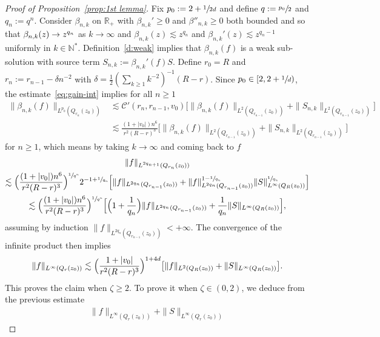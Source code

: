 \documentclass[JEP,XML,SOM,Unicode,NoFloatCountersInSection,published]{cedram}
\let\mathcal\mathscr
\theoremstyle{definition}
\theoremstyle{remark}
\newcommand\N{{\mathbb N}}
\newcommand\R{{\mathbb R}}
\newcommand{\cC}{\mathcal C}
\begin{document}
\begin{proof}[Proof of Proposition~\ref{prop:1st lemma}]
Fix $p_0:=2+\sfrac{1}{2d}$ and define $q:=\sfrac{p_0}{2}$ and
$q_n := q^n$. Consider $\beta_{n,k}$ on $\R_+$ with
$\beta_{n,k}' \ge 0$ and $\beta''_{n,k} \ge 0$ both bounded and
so that $\beta_{n,k}(z) \to\nobreak z^{q_n}$ as $k \to \infty$ and
$\beta_{n,k}(z) \lesssim z^{q_n}$ and
$\beta_{n,k}'(z) \lesssim z^{q_n-1}$ uniformly in $k \in
\N^*$. Definition~\ref{d:weak} implies that
$\beta_{n,k}(f)$ is a weak sub-solution with source term
$S_{n,k} := \beta_{n,k}'(f) S$. Define $r_0=R$ and
$r_n := r_{n-1} - \delta n^{-2}$ with
$\delta = \frac12( \sum_{k \ge 1} k^{-2}
)^{-1}(R-r)$. Since $p_0 \in [2,2+\sfrac1d)$, the
estimate~\eqref{eq:gain-int} implies for all $n \ge 1$
\begin{align*}
\|\beta_{n,k}(f)\|_{L^{p_0}(Q_{r_n}(z_0))}
& \lesssim
\cC'(r_n,r_{n-1},v_0) \bigl[
\|\beta_{n,k}(f)\|_{L^{2}(Q_{r_{n-1}}(z_0))}
+ \|S_{n,k}\|_{L^2(Q_{r_{n-1}}(z_0))} \bigr] \\
& \lesssim \frac{(1+|v_0|)n^6}{r^2(R-r)^3}
\bigl[ \|\beta_{n,k}(f)\|_{L^{2}(Q_{r_{n-1}}(z_0))}
+ \|S_{n,k}\|_{L^2(Q_{r_{n-1}}(z_0))} \bigr]
\end{align*}
for $n \ge 1$, which means by taking $k \to \infty$ and coming
back to $f$
\begin{multline*}
\|f\|_{L^{2q_{n+1}}(Q_{r_n}(z_0))} \\
\lesssim \Bigl(
\frac{(1+|v_0|)n^6}{r^2(R-r)^3} \Bigr)^{\sfrac{1}{q^n}}
2^{-1+\sfrac{1}{q_n}} \Bigl[
\|f\|_{L^{2q_n}(Q_{r_{n-1}}(z_0))} + \|
f\|_{L^{2q_n}(Q_{r_{n-1}}(z_0))}^{1-\sfrac{1}{q_n}}
\|S\|_{L^\infty(Q_R(z_0))}^{\sfrac{1}{q_n}} \Bigr] \\
\lesssim \Bigl(
\frac{(1+|v_0|)n^6}{r^2(R-r)^3} \Bigr)^{\sfrac{1}{q^n}}
\Bigl[ \Bigl( 1 + \frac{1}{q_n} \Bigr)
\|f\|_{L^{2q_n}(Q_{r_{n-1}}(z_0))} + \frac{1}{q_n}
\|S\|_{L^\infty(Q_R(z_0))} \Bigr],
\end{multline*}
assuming by induction
$\|f\|_{L^{2q_n}(Q_{r_{n-1}}(z_0))} < +\infty$. The convergence
of the infinite product then implies
\begin{equation*}
\|f\|_{L^\infty(Q_r(z_0))}
\lesssim \Bigl( \frac{1+|v_0|}{r^2(R-r)^3}
\Bigr)^{1+4d} \bigl[ \|f\|_{L^2(Q_R(z_0))} +
\|S\|_{L^\infty(Q_R(z_0))} \bigr].
\end{equation*}
This proves the claim when $\zeta \ge 2$. To prove it when
$\zeta \in (0,2)$, we deduce from the previous estimate
\begin{multline*}
\|f\|_{L^\infty(Q_r(z_0))} + \|S\|_{L^\infty(Q_r(z_0))}

\end{multline*}
\end{proof}
\end{document}
